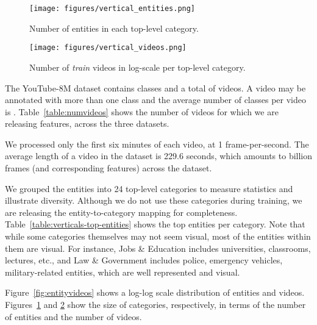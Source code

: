 \documentclass{sig-alternate-05-2015}
\begin{document}
\begin{figure*}
\begin{center}
  \begin{subfigure}[ht]{0.48\linewidth}
  \begin{center}
    \texttt{[image: figures/vertical\_entities.png]}
  \end{center}
  \caption{Number of entities in each top-level category.}
  \label{fig:verticalentities}
  \end{subfigure}
  \begin{subfigure}[ht]{0.48\linewidth}
  \begin{center}
    \texttt{[image: figures/vertical\_videos.png]}
  \caption{Number of {\it train} videos in log-scale per top-level category.}
  \label{fig:verticalvideos}
  \end{center}
  \end{subfigure}
\end{center}
\vspace{-0.2in}
\caption{Top-level category statistics of the YouTube-8M dataset.}
\end{figure*}



The YouTube-8M dataset contains  classes and a total of
 videos. A video may be annotated with more than one class and
the average number of classes per video is . Table~\ref{table:numvideos} shows the number of videos for which we are releasing features,
across the three datasets.

We processed only the first six minutes of each video, at 1 frame-per-second.
The average length of a video in the dataset is
229.6 seconds, which amounts to 
billion frames (and corresponding features) across the dataset.

We grouped the  entities into 24 top-level categories to measure statistics and illustrate diversity. Although
we do not use these categories during training, we are releasing the entity-to-category
mapping for completeness. Table~\ref{table:verticals-top-entities} shows
the top entities per category. Note that while some categories themselves may not seem
visual, most of the entities within them are visual. For instance, Jobs \& Education includes universities, classrooms, lectures, etc., and
Law \& Government includes police, emergency vehicles, military-related entities, which are well represented and visual.

Figure~\ref{fig:entityvideos} shows a log-log scale distribution
of entities and videos. Figures~\ref{fig:verticalentities} and \ref{fig:verticalvideos}
show the size of categories, respectively, in terms of the number of entities and
the number of videos.
\end{document}
